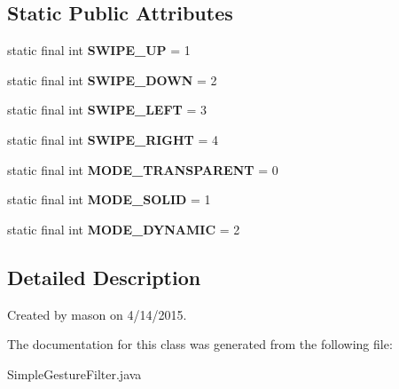 \subsection*{Static Public Attributes}
\begin{DoxyCompactItemize}
\item 
\hypertarget{classcom_1_1chopin_1_1SimpleGestureFilter_a312d0ab12c4bf31d1b837d5e55da9984}{}static final int {\bfseries S\+W\+I\+P\+E\+\_\+\+U\+P} = 1\label{classcom_1_1chopin_1_1SimpleGestureFilter_a312d0ab12c4bf31d1b837d5e55da9984}

\item 
\hypertarget{classcom_1_1chopin_1_1SimpleGestureFilter_a7f1321fdd2723813ae11e6f769cddc1c}{}static final int {\bfseries S\+W\+I\+P\+E\+\_\+\+D\+O\+W\+N} = 2\label{classcom_1_1chopin_1_1SimpleGestureFilter_a7f1321fdd2723813ae11e6f769cddc1c}

\item 
\hypertarget{classcom_1_1chopin_1_1SimpleGestureFilter_a60f246c8bc01218c0155f2ab6fffdf95}{}static final int {\bfseries S\+W\+I\+P\+E\+\_\+\+L\+E\+F\+T} = 3\label{classcom_1_1chopin_1_1SimpleGestureFilter_a60f246c8bc01218c0155f2ab6fffdf95}

\item 
\hypertarget{classcom_1_1chopin_1_1SimpleGestureFilter_a82dee6b6cf4984fd74b781ecd3ebf715}{}static final int {\bfseries S\+W\+I\+P\+E\+\_\+\+R\+I\+G\+H\+T} = 4\label{classcom_1_1chopin_1_1SimpleGestureFilter_a82dee6b6cf4984fd74b781ecd3ebf715}

\item 
\hypertarget{classcom_1_1chopin_1_1SimpleGestureFilter_a4906d19d6bc0eee19974a446db05d17e}{}static final int {\bfseries M\+O\+D\+E\+\_\+\+T\+R\+A\+N\+S\+P\+A\+R\+E\+N\+T} = 0\label{classcom_1_1chopin_1_1SimpleGestureFilter_a4906d19d6bc0eee19974a446db05d17e}

\item 
\hypertarget{classcom_1_1chopin_1_1SimpleGestureFilter_ac27a4d99dc8996ee9286e3bab0789d28}{}static final int {\bfseries M\+O\+D\+E\+\_\+\+S\+O\+L\+I\+D} = 1\label{classcom_1_1chopin_1_1SimpleGestureFilter_ac27a4d99dc8996ee9286e3bab0789d28}

\item 
\hypertarget{classcom_1_1chopin_1_1SimpleGestureFilter_ab80ed42868d3f0717aa033bca61c8bfc}{}static final int {\bfseries M\+O\+D\+E\+\_\+\+D\+Y\+N\+A\+M\+I\+C} = 2\label{classcom_1_1chopin_1_1SimpleGestureFilter_ab80ed42868d3f0717aa033bca61c8bfc}

\end{DoxyCompactItemize}


\subsection{Detailed Description}
Created by mason on 4/14/2015. 

The documentation for this class was generated from the following file\+:\begin{DoxyCompactItemize}
\item 
Simple\+Gesture\+Filter.\+java\end{DoxyCompactItemize}
